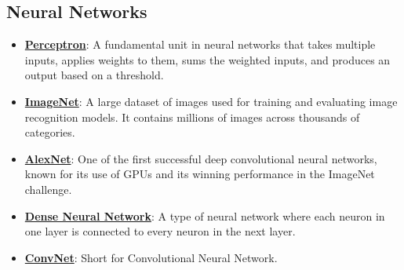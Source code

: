 \documentclass{article}%
\begin{document}
%
\subsection{Neural Networks}%
\label{subsec:NeuralNetworks}%
\begin{itemize}[leftmargin=*]%
\item \href{https://purdue.brightspace.com/d2l/common/assets/pdfjs-d2l-dist/1.0.14-legacy/web/viewer.html?file=\%2Fcontent\%2Fenforced\%2F1095467-wl.202510.CS.24300.001\%2F02L2-Intro.pdf\%3Fou\%3D1095467\&lang=en-us\&container=d2l-fileviewer-rendered-pdf\&fullscreen=d2l-fileviewer-rendered-pdf-dialog\&height=667#page=45}{\textbf{Perceptron}}: A fundamental unit in neural networks that takes multiple inputs, applies weights to them, sums the weighted inputs, and produces an output based on a threshold.%
\item \href{https://purdue.brightspace.com/d2l/common/assets/pdfjs-d2l-dist/1.0.14-legacy/web/viewer.html?file=\%2Fcontent\%2Fenforced\%2F1095467-wl.202510.CS.24300.001\%2F09L1-cnn.pdf\%3Fou\%3D1095467\&lang=en-us\&container=d2l-fileviewer-rendered-pdf\&fullscreen=d2l-fileviewer-rendered-pdf-dialog\&height=667#page=3}{\textbf{ImageNet}}: A large dataset of images used for training and evaluating image recognition models. It contains millions of images across thousands of categories.%
\item \href{https://purdue.brightspace.com/d2l/common/assets/pdfjs-d2l-dist/1.0.14-legacy/web/viewer.html?file=\%2Fcontent\%2Fenforced\%2F1095467-wl.202510.CS.24300.001\%2F09L1-cnn.pdf\%3Fou\%3D1095467\&lang=en-us\&container=d2l-fileviewer-rendered-pdf\&fullscreen=d2l-fileviewer-rendered-pdf-dialog\&height=667#page=3}{\textbf{AlexNet}}: One of the first successful deep convolutional neural networks, known for its use of GPUs and its winning performance in the ImageNet challenge.%
\item \href{https://purdue.brightspace.com/d2l/common/assets/pdfjs-d2l-dist/1.0.14-legacy/web/viewer.html?file=\%2Fcontent\%2Fenforced\%2F1095467-wl.202510.CS.24300.001\%2F09L1-cnn.pdf\%3Fou\%3D1095467\&lang=en-us\&container=d2l-fileviewer-rendered-pdf\&fullscreen=d2l-fileviewer-rendered-pdf-dialog\&height=667#page=4}{\textbf{Dense Neural Network}}: A type of neural network where each neuron in one layer is connected to every neuron in the next layer.%
\item \href{https://purdue.brightspace.com/d2l/common/assets/pdfjs-d2l-dist/1.0.14-legacy/web/viewer.html?file=\%2Fcontent\%2Fenforced\%2F1095467-wl.202510.CS.24300.001\%2F09L1-cnn.pdf\%3Fou\%3D1095467\&lang=en-us\&container=d2l-fileviewer-rendered-pdf\&fullscreen=d2l-fileviewer-rendered-pdf-dialog\&height=667#page=4}{\textbf{ConvNet}}: Short for Convolutional Neural Network.%

\end{itemize}
\end{document}
